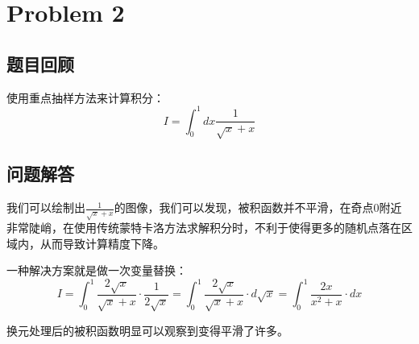 \documentclass[12pt,a4paper]{article}%
\begin{document}
\section{Problem 2}
\subsection{题目回顾}
使用重点抽样方法来计算积分：
\[I=\int_{0}^{1}dx \frac{1}{\sqrt{x}+x}\]
\subsection{问题解答}
我们可以绘制出$\frac{1}{\sqrt{x}+x}$的图像，我们可以发现，被积函数并不平滑，在奇点0附近非常陡峭，在使用传统蒙特卡洛方法求解积分时，不利于使得更多的随机点落在区域内，从而导致计算精度下降。

一种解决方案就是做一次变量替换：
\[I=\int_{0}^{1}\frac{2\sqrt{x}}{\sqrt{x}+x}\cdot \frac{1}{2\sqrt{x}}=\int_{0}^{1}\frac{2\sqrt{x}}{\sqrt{x}+x}\cdot d\sqrt{x}=\int_{0}^{1}\frac{2x}{x^2+x}\cdot dx\]

换元处理后的被积函数明显可以观察到变得平滑了许多。
\end{document}
